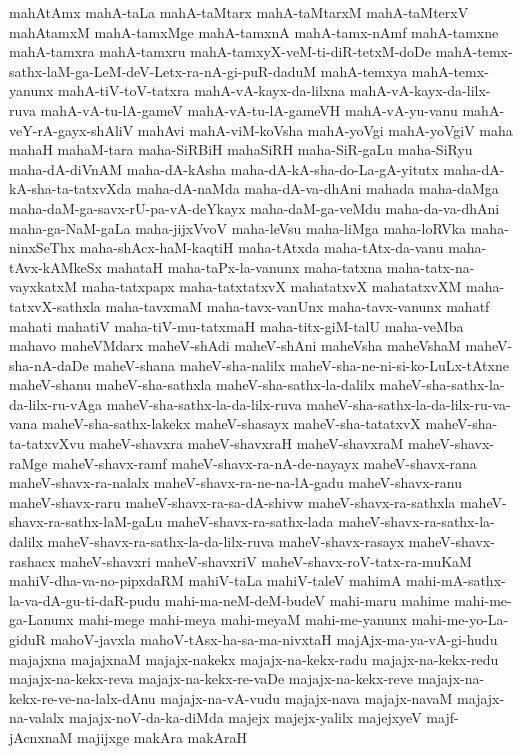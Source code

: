 {mahAtAmx
mahA-taLa
mahA-taMtarx
mahA-taMtarxM
mahA-taMterxV
mahAtamxM
mahA-tamxMge
mahA-tamxnA
mahA-tamx-nAmf
mahA-tamxne
mahA-tamxra
mahA-tamxru
mahA-tamxyX-veM-ti-diR-tetxM-doDe
mahA-temx-sathx-laM-ga-LeM-deV-Letx-ra-nA-gi-puR-daduM
mahA-temxya
mahA-temx-yanunx
mahA-tiV-toV-tatxra
mahA-vA-kayx-da-lilxna
mahA-vA-kayx-da-lilx-ruva
mahA-vA-tu-lA-gameV
mahA-vA-tu-lA-gameVH
mahA-vA-yu-vanu
mahA-veY-rA-gayx-shAliV
mahAvi
mahA-viM-koVsha
mahA-yoVgi
mahA-yoVgiV
maha
mahaH
mahaM-tara
maha-SiRBiH
mahaSiRH
maha-SiR-gaLu
maha-SiRyu
maha-dA-diVnAM
maha-dA-kAsha
maha-dA-kA-sha-do-La-gA-yitutx
maha-dA-kA-sha-ta-tatxvXda
maha-dA-naMda
maha-dA-va-dhAni
mahada
maha-daMga
maha-daM-ga-savx-rU-pa-vA-deYkayx
maha-daM-ga-veMdu
maha-da-va-dhAni
maha-ga-NaM-gaLa
maha-jijxVvoV
maha-leVsu
maha-liMga
maha-loRVka
maha-ninxSeThx
maha-shAcx-haM-kaqtiH
maha-tAtxda
maha-tAtx-da-vanu
maha-tAvx-kAMkeSx
mahataH
maha-taPx-la-vanunx
maha-tatxna
maha-tatx-na-vayxkatxM
maha-tatxpapx
maha-tatxtatxvX
mahatatxvX
mahatatxvXM
maha-tatxvX-sathxla
maha-tavxmaM
maha-tavx-vanUnx
maha-tavx-vanunx
mahatf
mahati
mahatiV
maha-tiV-mu-tatxmaH
maha-titx-giM-talU
maha-veMba
mahavo
maheVMdarx
maheV-shAdi
maheV-shAni
maheVsha
maheVshaM
maheV-sha-nA-daDe
maheV-shana
maheV-sha-nalilx
maheV-sha-ne-ni-si-ko-LuLx-tAtxne
maheV-shanu
maheV-sha-sathxla
maheV-sha-sathx-la-dalilx
maheV-sha-sathx-la-da-lilx-ru-vAga
maheV-sha-sathx-la-da-lilx-ruva
maheV-sha-sathx-la-da-lilx-ru-va-vana
maheV-sha-sathx-lakekx
maheV-shasayx
maheV-sha-tatatxvX
maheV-sha-ta-tatxvXvu
maheV-shavxra
maheV-shavxraH
maheV-shavxraM
maheV-shavx-raMge
maheV-shavx-ramf
maheV-shavx-ra-nA-de-nayayx
maheV-shavx-rana
maheV-shavx-ra-nalalx
maheV-shavx-ra-ne-na-lA-gadu
maheV-shavx-ranu
maheV-shavx-raru
maheV-shavx-ra-sa-dA-shivw
maheV-shavx-ra-sathxla
maheV-shavx-ra-sathx-laM-gaLu
maheV-shavx-ra-sathx-lada
maheV-shavx-ra-sathx-la-dalilx
maheV-shavx-ra-sathx-la-da-lilx-ruva
maheV-shavx-rasayx
maheV-shavx-rashacx
maheV-shavxri
maheV-shavxriV
maheV-shavx-roV-tatx-ra-muKaM
mahiV-dha-va-no-pipxdaRM
mahiV-taLa
mahiV-taleV
mahimA
mahi-mA-sathx-la-va-dA-gu-ti-daR-pudu
mahi-ma-neM-deM-budeV
mahi-maru
mahime
mahi-me-ga-Lanunx
mahi-mege
mahi-meya
mahi-meyaM
mahi-me-yanunx
mahi-me-yo-La-giduR
mahoV-javxla
mahoV-tAsx-ha-sa-ma-nivxtaH
majAjx-ma-ya-vA-gi-hudu
majajxna
majajxnaM
majajx-nakekx
majajx-na-kekx-radu
majajx-na-kekx-redu
majajx-na-kekx-reva
majajx-na-kekx-re-vaDe
majajx-na-kekx-reve
majajx-na-kekx-re-ve-na-lalx-dAnu
majajx-na-vA-vudu
majajx-nava
majajx-navaM
majajx-na-valalx
majajx-noV-da-ka-diMda
majejx
majejx-yalilx
majejxyeV
majf-jAcnxnaM
majijxge
makAra
makAraH
}
